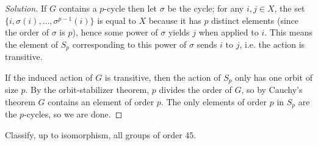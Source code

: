 \documentclass[10pt]{article}
\newenvironment{soln}{\begin{proof}[Solution]}{\end{proof}}
\begin{document}
\begin{soln}
    If $G$ contains a $p$-cycle then let $\sigma$ be the cycle;
    for any $i,j\in X$, the set $\{i, \sigma(i), \dots, \sigma^{p-1}(i)\}$
    is equal to $X$ because it has $p$ distinct elements
    (since the order of $\sigma$ is $p$), hence
    some power of $\sigma$ yields $j$ when applied to $i$.
    This means the element of $S_p$ corresponding to this power of $\sigma$
    sends $i$ to $j$, i.e. the action is transitive.

    If the induced action of $G$ is transitive,
    then the action of $S_p$ only has one orbit of size $p$.
    By the orbit-stabilizer theorem, $p$ divides the order of $G$,
    so by Cauchy's theorem $G$ contains an element of order $p$.
    The only elements of order $p$ in $S_p$ are the $p$-cycles,
    so we are done.
\end{soln}

\begin{problem}
    Classify, up to isomorphism, all groups of order $45$.
\end{problem}
\end{document}

